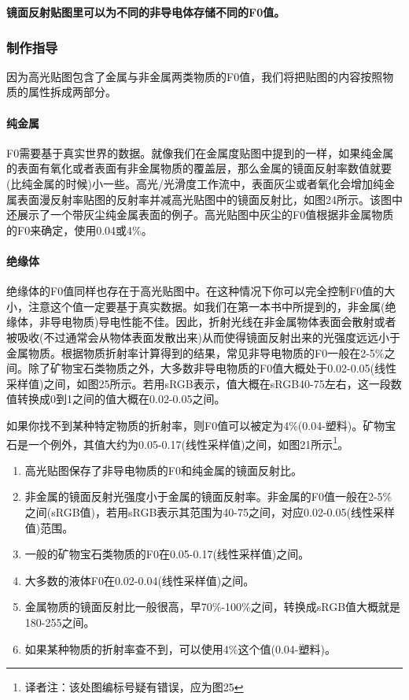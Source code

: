 \textbf{镜面反射贴图里可以为不同的非导电体存储不同的F0值。}

\subsubsection{制作指导}

因为高光贴图包含了金属与非金属两类物质的F0值，我们将把贴图的内容按照物质的属性拆成两部分。

\paragraph{纯金属}

F0需要基于真实世界的数据。就像我们在金属度贴图中提到的一样，如果纯金属的表面有氧化或者表面有非金属物质的覆盖层，那么金属的镜面反射率数值就要(比纯金属的时候)小一些。高光/光滑度工作流中，表面灰尘或者氧化会增加纯金属表面漫反射率贴图的反射率并减高光贴图中的镜面反射比，如图24所示。该图中还展示了一个带灰尘纯金属表面的例子。高光贴图中灰尘的F0值根据非金属物质的F0来确定，使用0.04或4\%。

\paragraph{绝缘体}

绝缘体的F0值同样也存在于高光贴图中。在这种情况下你可以完全控制F0值的大小，注意这个值一定要基于真实数据。如我们在第一本书中所提到的，非金属(绝缘体，非导电物质)导电性能不佳。因此，折射光线在非金属物体表面会散射或者被吸收(不过通常会从物体表面发散出来)从而使得镜面反射出来的光强度远远小于金属物质。根据物质折射率计算得到的结果，常见非导电物质的F0一般在2-5\%之间。除了矿物宝石类物质之外，大多数非导电物质的F0值大概处于0.02-0.05(线性采样值)之间，如图25所示。若用sRGB表示，值大概在sRGB40-75左右，这一段数值转换成0到1之间的值大概在0.02-0.05之间。

如果你找不到某种特定物质的折射率，则F0值可以被定为4\%(0.04-塑料)。矿物宝石是一个例外，其值大约为0.05-0.17(线性采样值)之间，如图21所示\footnote{译者注：该处图编标号疑有错误，应为图25}。

\begin{enumerate}
\item 高光贴图保存了非导电物质的F0和纯金属的镜面反射比。
\item 非金属的镜面反射光强度小于金属的镜面反射率。非金属的F0值一般在2-5\%之间(sRGB值)，若用sRGB表示其范围为40-75之间，对应0.02-0.05(线性采样值)范围。
\item 一般的矿物宝石类物质的F0在0.05-0.17(线性采样值)之间。
\item 大多数的液体F0在0.02-0.04(线性采样值)之间。
\item 金属物质的镜面反射比一般很高，早70\%-100\%之间，转换成sRGB值大概就是180-255之间。
\item 如果某种物质的折射率查不到，可以使用4\%这个值(0.04-塑料)。
\end{enumerate}

